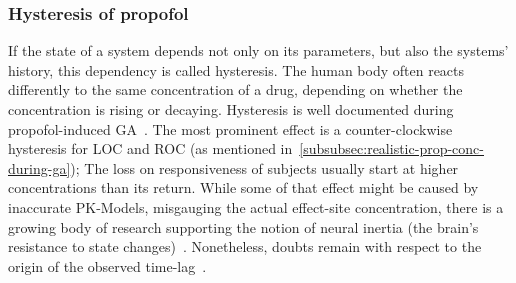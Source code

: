 \subsubsection{Hysteresis of propofol}\label{subsubsec:hysteresis}

If the state of a system depends not only on its parameters, but also the systems' history,
this dependency is called hysteresis.
The human body often reacts differently to the same concentration of a drug,
depending on whether the concentration is rising or decaying.
Hysteresis is well documented during propofol-induced GA~\cite{kuizenga_quantitative_1998,
    iwakiri_individual_2005,sepulveda_evidence_2018,ferreira_patterns_2020, su_hysteresis_2020}.
The most prominent effect is a counter-clockwise hysteresis for LOC and ROC (as mentioned
in~\ref{subsubsec:realistic-prop-conc-during-ga});
The loss on responsiveness of subjects usually start at higher concentrations than its return.
While some of that effect might be caused by inaccurate PK-Models,
misgauging the actual effect-site concentration,
there is a growing body of research supporting the notion of neural inertia
(the brain's resistance to state changes)~\cite{su_hysteresis_2020, ferreira_patterns_2020, luppi_inert_2021}.
Nonetheless, doubts remain with respect to the origin
of the observed time-lag~\cite{mckay_pharmacokinetic_pharmacodynamic_2006, sepulveda_evidence_2018}.
